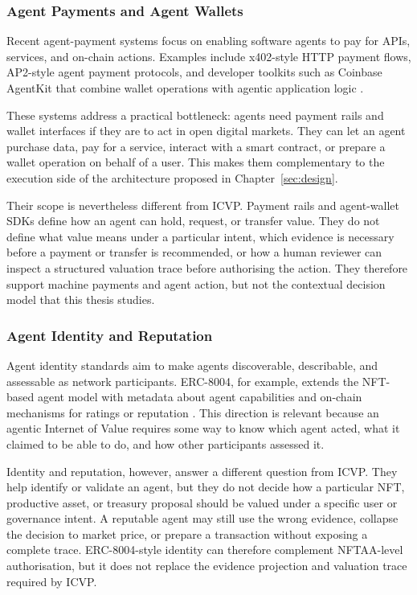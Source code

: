 \subsubsection{Agent Payments and Agent Wallets}

Recent agent-payment systems focus on enabling software agents to pay for APIs,
services, and on-chain actions. Examples include x402-style HTTP payment flows,
AP2-style agent payment protocols, and developer toolkits such as Coinbase
AgentKit that combine wallet operations with agentic application logic
\cite{x402Protocol, AP2Spec, CoinbaseAgentKit}.

These systems address a practical bottleneck: agents need payment rails and
wallet interfaces if they are to act in open digital markets. They can let an
agent purchase data, pay for a service, interact with a smart contract, or
prepare a wallet operation on behalf of a user. This makes them complementary to
the execution side of the architecture proposed in Chapter~\ref{sec:design}.

Their scope is nevertheless different from ICVP. Payment rails and agent-wallet
SDKs define how an agent can hold, request, or transfer value. They do not define
what value means under a particular intent, which evidence is necessary before a
payment or transfer is recommended, or how a human reviewer can inspect a
structured valuation trace before authorising the action. They therefore
support machine payments and agent action, but not the contextual decision model
that this thesis studies.

\subsubsection{Agent Identity and Reputation}

Agent identity standards aim to make agents discoverable, describable, and
assessable as network participants. ERC-8004, for example, extends the NFT-based
agent model with metadata about agent capabilities and on-chain mechanisms for
ratings or reputation \cite{EIP8004}. This direction is relevant because an
agentic Internet of Value requires some way to know which agent acted, what it
claimed to be able to do, and how other participants assessed it.

Identity and reputation, however, answer a different question from ICVP. They
help identify or validate an agent, but they do not decide how a particular NFT,
productive asset, or treasury proposal should be valued under a specific user or
governance intent. A reputable agent may still use the wrong evidence, collapse
the decision to market price, or prepare a transaction without exposing a
complete trace. ERC-8004-style identity can therefore complement NFTAA-level
authorisation, but it does not replace the evidence projection and valuation
trace required by ICVP.

